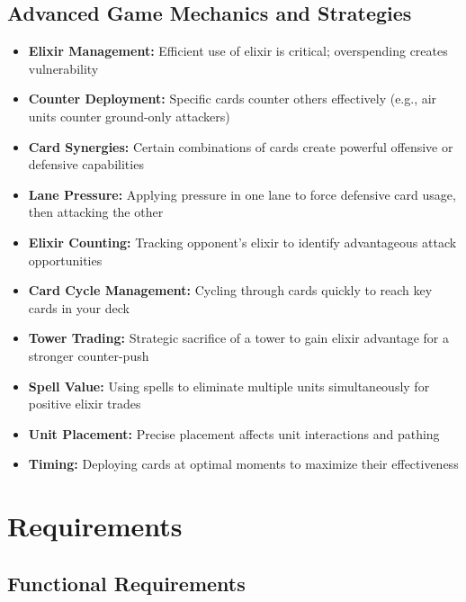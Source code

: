 \documentclass{article}
\begin{document}
\subsection{Advanced Game Mechanics and Strategies}
\begin{itemize}
    \item \textbf{Elixir Management:} Efficient use of elixir is critical; overspending creates vulnerability
    \item \textbf{Counter Deployment:} Specific cards counter others effectively (e.g., air units counter ground-only attackers)
    \item \textbf{Card Synergies:} Certain combinations of cards create powerful offensive or defensive capabilities
    \item \textbf{Lane Pressure:} Applying pressure in one lane to force defensive card usage, then attacking the other
    \item \textbf{Elixir Counting:} Tracking opponent's elixir to identify advantageous attack opportunities
    \item \textbf{Card Cycle Management:} Cycling through cards quickly to reach key cards in your deck
    \item \textbf{Tower Trading:} Strategic sacrifice of a tower to gain elixir advantage for a stronger counter-push
    \item \textbf{Spell Value:} Using spells to eliminate multiple units simultaneously for positive elixir trades
    \item \textbf{Unit Placement:} Precise placement affects unit interactions and pathing
    \item \textbf{Timing:} Deploying cards at optimal moments to maximize their effectiveness
\end{itemize}

\section{Requirements}

\subsection{Functional Requirements}
\end{document}
